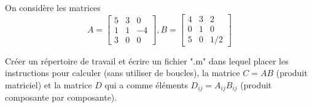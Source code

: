 On considère les matrices
\begin{equation*}
  A = \begin{bmatrix}
        5 & 3 & 0  \\
        1 & 1 & -4 \\
        3 & 0 & 0
      \end{bmatrix}
  ,
  B = \begin{bmatrix}
        4 & 3 & 2  \\
        0 & 1 & 0  \\
        5 & 0 & 1/2
      \end{bmatrix}
\end{equation*}


Créer un répertoire de travail et écrire un fichier ".m" dans lequel placer les instructions pour calculer (sans utiliser de boucles), la matrice $C = AB$ (produit matriciel) et la matrice $D$ qui a comme éléments $D_{ij} = A_{ij} B_{ij}$ (produit composante par composante).





